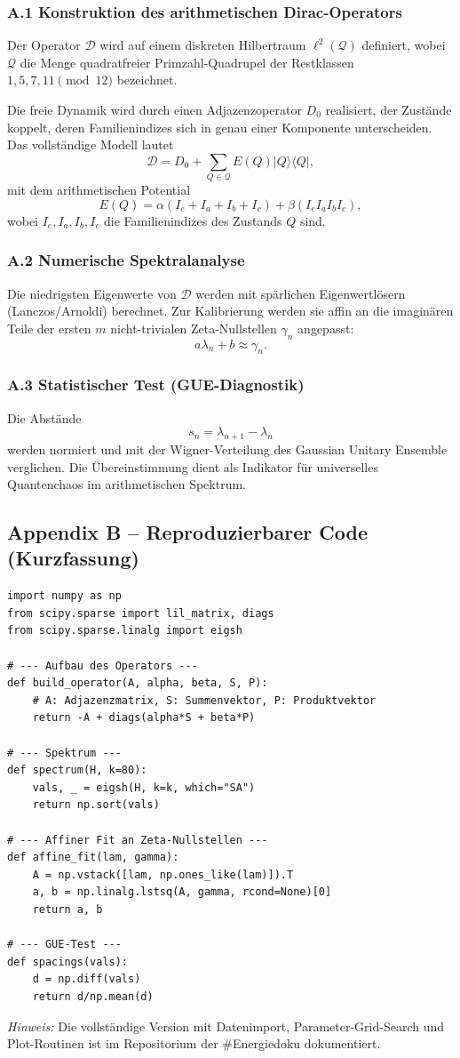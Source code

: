 \documentclass[11pt,a4paper]{article}
\begin{document}
\subsubsection*{A.1 Konstruktion des arithmetischen Dirac-Operators}

Der Operator $\mathcal{D}$ wird auf einem diskreten Hilbertraum $\ell^2(\mathcal{Q})$ definiert, wobei $\mathcal{Q}$ die Menge quadratfreier Primzahl-Quadrupel der Restklassen
$1,5,7,11 \pmod{12}$ bezeichnet.

Die freie Dynamik wird durch einen Adjazenzoperator $D_0$ realisiert, der Zustände koppelt, deren Familienindizes sich in genau einer Komponente unterscheiden. Das vollständige Modell lautet
\[
\mathcal{D} = D_0 + \sum_{Q\in\mathcal{Q}} E(Q) |Q\rangle\langle Q|,
\]
mit dem arithmetischen Potential
\[
E(Q)=\alpha (I_e+I_a+I_b+I_c)+\beta (I_e I_a I_b I_c),
\]
wobei $I_e,I_a,I_b,I_c$ die Familienindizes des Zustands $Q$ sind.

\subsubsection*{A.2 Numerische Spektralanalyse}

Die niedrigsten Eigenwerte von $\mathcal{D}$ werden mit spärlichen Eigenwertlösern (Lanczos/Arnoldi) berechnet.
Zur Kalibrierung werden sie affin an die imaginären Teile der ersten $m$ nicht-trivialen Zeta-Nullstellen $\gamma_n$ angepasst:
\[
a \lambda_n+b \approx \gamma_n.
\]

\subsubsection*{A.3 Statistischer Test (GUE-Diagnostik)}

Die Abstände
\[
s_n=\lambda_{n+1}-\lambda_n
\]
werden normiert und mit der Wigner-Verteilung des Gaussian Unitary Ensemble verglichen. Die Übereinstimmung dient als Indikator für universelles Quantenchaos im arithmetischen Spektrum.

\subsection*{Appendix B -- Reproduzierbarer Code (Kurzfassung)}

\begin{lstlisting}
import numpy as np
from scipy.sparse import lil_matrix, diags
from scipy.sparse.linalg import eigsh

# --- Aufbau des Operators ---
def build_operator(A, alpha, beta, S, P):
    # A: Adjazenzmatrix, S: Summenvektor, P: Produktvektor
    return -A + diags(alpha*S + beta*P)

# --- Spektrum ---
def spectrum(H, k=80):
    vals, _ = eigsh(H, k=k, which="SA")
    return np.sort(vals)

# --- Affiner Fit an Zeta-Nullstellen ---
def affine_fit(lam, gamma):
    A = np.vstack([lam, np.ones_like(lam)]).T
    a, b = np.linalg.lstsq(A, gamma, rcond=None)[0]
    return a, b

# --- GUE-Test ---
def spacings(vals):
    d = np.diff(vals)
    return d/np.mean(d)
\end{lstlisting}

\textit{Hinweis:} Die vollständige Version mit Datenimport, Parameter-Grid-Search und Plot-Routinen ist im Repositorium der \#Energiedoku dokumentiert.
\end{document}
